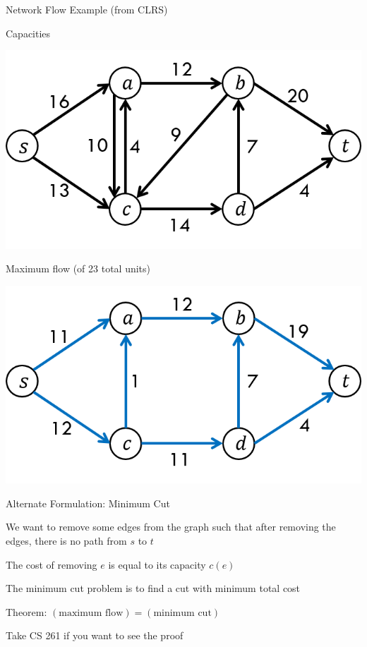 \documentclass[13pt,onlymath]{beamer}
\begin{document}
\begin{frame}{Network Flow Example (from CLRS)}
\BIT
\item Capacities
\begin{center}
\includegraphics[height=0.3\textheight]{figures/flow_example1}
\end{center}
\vfill
\item Maximum flow (of 23 total units)
\begin{center}
\includegraphics[height=0.3\textheight]{figures/flow_example2}
\end{center}
\EIT
\end{frame}

\begin{frame}{Alternate Formulation: Minimum Cut}
\BIT
\item We want to remove some edges from the graph such that after removing the edges, there is no path from $s$ to $t$
\item The cost of removing $e$ is equal to its capacity $c(e)$
\item The minimum cut problem is to find a cut with minimum total cost
\vfill
\item Theorem: $(\mbox{maximum flow}) = (\mbox{minimum cut})$
\item Take CS 261 if you want to see the proof
\EIT
\end{frame}
\end{document}
